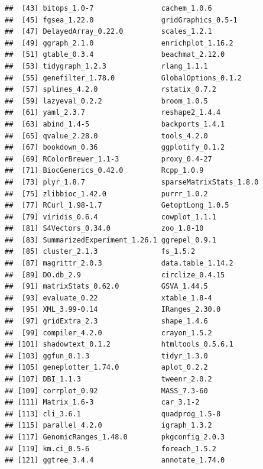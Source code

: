 \documentclass[
  12pt,
]{book}
\begin{document}
\begin{verbatim}
##  [43] bitops_1.0-7                cachem_1.0.6               
##  [45] fgsea_1.22.0                gridGraphics_0.5-1         
##  [47] DelayedArray_0.22.0         scales_1.2.1               
##  [49] ggraph_2.1.0                enrichplot_1.16.2          
##  [51] gtable_0.3.4                beachmat_2.12.0            
##  [53] tidygraph_1.2.3             rlang_1.1.1                
##  [55] genefilter_1.78.0           GlobalOptions_0.1.2        
##  [57] splines_4.2.0               rstatix_0.7.2              
##  [59] lazyeval_0.2.2              broom_1.0.5                
##  [61] yaml_2.3.7                  reshape2_1.4.4             
##  [63] abind_1.4-5                 backports_1.4.1            
##  [65] qvalue_2.28.0               tools_4.2.0                
##  [67] bookdown_0.36               ggplotify_0.1.2            
##  [69] RColorBrewer_1.1-3          proxy_0.4-27               
##  [71] BiocGenerics_0.42.0         Rcpp_1.0.9                 
##  [73] plyr_1.8.7                  sparseMatrixStats_1.8.0    
##  [75] zlibbioc_1.42.0             purrr_1.0.2                
##  [77] RCurl_1.98-1.7              GetoptLong_1.0.5           
##  [79] viridis_0.6.4               cowplot_1.1.1              
##  [81] S4Vectors_0.34.0            zoo_1.8-10                 
##  [83] SummarizedExperiment_1.26.1 ggrepel_0.9.1              
##  [85] cluster_2.1.3               fs_1.5.2                   
##  [87] magrittr_2.0.3              data.table_1.14.2          
##  [89] DO.db_2.9                   circlize_0.4.15            
##  [91] matrixStats_0.62.0          GSVA_1.44.5                
##  [93] evaluate_0.22               xtable_1.8-4               
##  [95] XML_3.99-0.14               IRanges_2.30.0             
##  [97] gridExtra_2.3               shape_1.4.6                
##  [99] compiler_4.2.0              crayon_1.5.2               
## [101] shadowtext_0.1.2            htmltools_0.5.6.1          
## [103] ggfun_0.1.3                 tidyr_1.3.0                
## [105] geneplotter_1.74.0          aplot_0.2.2                
## [107] DBI_1.1.3                   tweenr_2.0.2               
## [109] corrplot_0.92               MASS_7.3-60                
## [111] Matrix_1.6-3                car_3.1-2                  
## [113] cli_3.6.1                   quadprog_1.5-8             
## [115] parallel_4.2.0              igraph_1.3.2               
## [117] GenomicRanges_1.48.0        pkgconfig_2.0.3            
## [119] km.ci_0.5-6                 foreach_1.5.2              
## [121] ggtree_3.4.4                annotate_1.74.0            

\end{verbatim}
\end{document}
